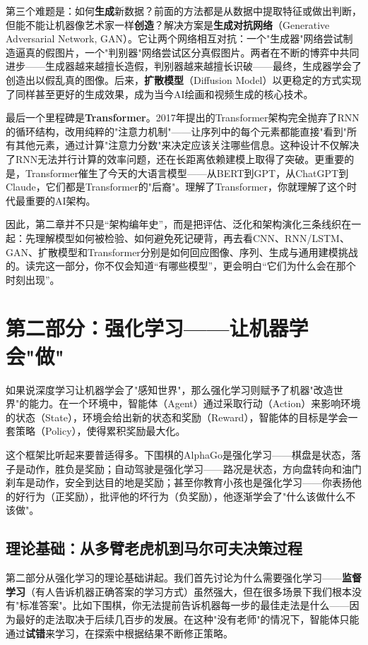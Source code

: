 \documentclass[lang=cn,zihao=-4,a4paper,fontset=windows]{beautybook}
\begin{document}
{第三个难题是：如何\textbf{生成}新数据？前面的方法都是从数据中提取特征或做出判断，但能不能让机器像艺术家一样\textbf{创造}？解决方案是\textbf{生成对抗网络}（Generative Adversarial Network, GAN）。它让两个网络相互对抗：一个"生成器"网络尝试制造逼真的假图片，一个"判别器"网络尝试区分真假图片。两者在不断的博弈中共同进步——生成器越来越擅长造假，判别器越来越擅长识破——最终，生成器学会了创造出以假乱真的图像。后来，\textbf{扩散模型}（Diffusion Model）以更稳定的方式实现了同样甚至更好的生成效果，成为当今AI绘画和视频生成的核心技术。

最后一个里程碑是\textbf{Transformer}。2017年提出的Transformer架构完全抛弃了RNN的循环结构，改用纯粹的"注意力机制"——让序列中的每个元素都能直接"看到"所有其他元素，通过计算"注意力分数"来决定应该关注哪些信息。这种设计不仅解决了RNN无法并行计算的效率问题，还在长距离依赖建模上取得了突破。更重要的是，Transformer催生了今天的大语言模型——从BERT到GPT，从ChatGPT到Claude，它们都是Transformer的"后裔"。理解了Transformer，你就理解了这个时代最重要的AI架构。

因此，第二章并不只是“架构编年史”，而是把评估、泛化和架构演化三条线织在一起：先理解模型如何被检验、如何避免死记硬背，再去看CNN、RNN/LSTM、GAN、扩散模型和Transformer分别是如何回应图像、序列、生成与通用建模挑战的。读完这一部分，你不仅会知道“有哪些模型”，更会明白“它们为什么会在那个时刻出现”。

\section*{第二部分：强化学习——让机器学会"做"}

如果说深度学习让机器学会了"感知世界"，那么强化学习则赋予了机器"改造世界"的能力。在一个环境中，智能体（Agent）通过采取行动（Action）来影响环境的状态（State），环境会给出新的状态和奖励（Reward），智能体的目标是学会一套策略（Policy），使得累积奖励最大化。

这个框架比听起来要普适得多。下围棋的AlphaGo是强化学习——棋盘是状态，落子是动作，胜负是奖励；自动驾驶是强化学习——路况是状态，方向盘转向和油门刹车是动作，安全到达目的地是奖励；甚至你教育小孩也是强化学习——你表扬他的好行为（正奖励），批评他的坏行为（负奖励），他逐渐学会了"什么该做什么不该做"。

\subsection*{理论基础：从多臂老虎机到马尔可夫决策过程}

第二部分从强化学习的理论基础讲起。我们首先讨论为什么需要强化学习——\textbf{监督学习}（有人告诉机器正确答案的学习方式）虽然强大，但在很多场景下我们根本没有"标准答案"。比如下围棋，你无法提前告诉机器每一步的最佳走法是什么——因为最好的走法取决于后续几百步的发展。在这种"没有老师"的情况下，智能体只能通过\textbf{试错}来学习，在探索中根据结果不断修正策略。

}
\end{document}
